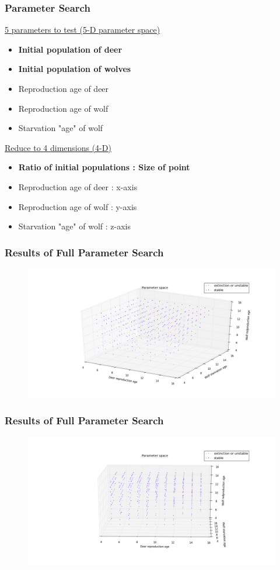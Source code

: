 \documentclass{beamer}
\begin{document}
\frame
{
  \frametitle{Parameter Search}
  \underline{5 parameters to test (5-D parameter space)}
  \begin{itemize}
  \item{\textbf{Initial population of deer}}
  \item{\textbf{Initial population of wolves}}
  \item{Reproduction age of deer}
  \item{Reproduction age of wolf}
  \item{Starvation "age" of wolf}
  \end{itemize} 

  \underline{Reduce to 4 dimensions (4-D)}
  \begin{itemize}
  \item{\textbf{Ratio of initial populations : Size of point}}
  \item{Reproduction age of deer : x-axis}
  \item{Reproduction age of wolf : y-axis}
  \item{Starvation "age" of wolf : z-axis}
  \end{itemize} 

}
\frame
{
  \frametitle{Results of Full Parameter Search}
  \begin{figure}[H]
	\includegraphics[width = 1\textwidth]{./pics/Eco_All_param_front.png} 
  \end{figure}
        
}

\frame
{
  \frametitle{Results of Full Parameter Search}
  \begin{figure}[H]
	\includegraphics[width = 1\textwidth]{./pics/Eco_All_param_rep_v_rep.png} 
  \end{figure}
}
\end{document}
